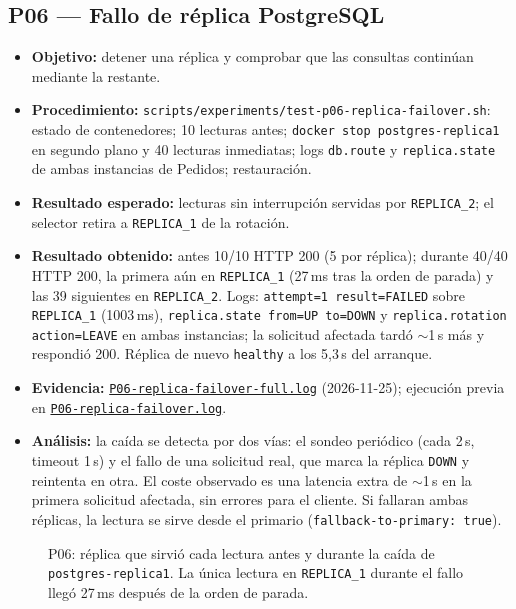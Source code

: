 \documentclass[
  spanish,
  a4paper,
  11pt
]{article}
\providecommand{\tightlist}{\setlength{\itemsep}{0pt}\setlength{\parskip}{0pt}}
\newcommand{\evid}[1]{\href{https://github.com/yan2005dris-afk/SDCC---microservices-with-gateway-and-loadbalancer/blob/develop/docs/evidencias/#1}{{\urlstyle{tt}\nolinkurl{#1}}}}
\begin{document}
\subsection{P06 --- Fallo de réplica PostgreSQL}
\begin{itemize}
\tightlist
\item \textbf{Objetivo:} detener una réplica y comprobar que las consultas continúan mediante la restante.
\item \textbf{Procedimiento:} \texttt{scripts/experiments/test-p06-replica-failover.sh}: estado de contenedores; 10 lecturas antes; \texttt{docker stop postgres-replica1} en segundo plano y 40 lecturas inmediatas; logs \texttt{db.route} y \texttt{replica.state} de ambas instancias de Pedidos; restauración.
\item \textbf{Resultado esperado:} lecturas sin interrupción servidas por \texttt{REPLICA\_2}; el selector retira a \texttt{REPLICA\_1} de la rotación.
\item \textbf{Resultado obtenido:} antes 10/10 HTTP 200 (5 por réplica); durante 40/40 HTTP 200, la primera aún en \texttt{REPLICA\_1} (27\,ms tras la orden de parada) y las 39 siguientes en \texttt{REPLICA\_2}. Logs: \texttt{attempt=1 result=FAILED} sobre \texttt{REPLICA\_1} (1003\,ms), \texttt{replica.state from=UP to=DOWN} y \texttt{replica.rotation action=LEAVE} en ambas instancias; la solicitud afectada tardó $\sim$1\,s más y respondió 200. Réplica de nuevo \texttt{healthy} a los 5,3\,s del arranque.
\item \textbf{Evidencia:} \evid{P06-replica-failover-full.log} (2026-11-25); ejecución previa en \evid{P06-replica-failover.log}.
\item \textbf{Análisis:} la caída se detecta por dos vías: el sondeo periódico (cada 2\,s, timeout 1\,s) y el fallo de una solicitud real, que marca la réplica \texttt{DOWN} y reintenta en otra. El coste observado es una latencia extra de $\sim$1\,s en la primera solicitud afectada, sin errores para el cliente. Si fallaran ambas réplicas, la lectura se sirve desde el primario (\texttt{fallback-to-primary: true}).
\end{itemize}

\begin{figure}[H]
\centering
{}
\caption{P06: réplica que sirvió cada lectura antes y durante la caída de \texttt{postgres-replica1}. La única lectura en \texttt{REPLICA\_1} durante el fallo llegó 27\,ms después de la orden de parada.}
\label{fig:p06}
\end{figure}
\end{document}
